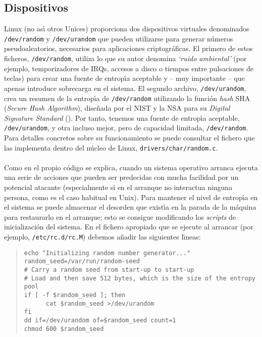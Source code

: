 \subsection{Dispositivos}
Linux (no as\'{\i} otros Unices) proporciona dos dispositivos virtuales 
denominados {\tt /dev/random} y {\tt /dev/urandom} que pueden utilizarse para
generar n\'umeros pseudoaleatorios, necesarios para aplicaciones 
criptogr\'aficas. El primero de estos ficheros, {\tt /dev/random}, utiliza lo
que su autor denomina {\it `ruido ambiental'} (por ejemplo, temporizadores de
IRQs, accesos a disco o tiempos entre pulsaciones de teclas) para crear 
una fuente de entrop\'{\i}a aceptable y -- muy importante -- que apenas 
introduce sobrecarga en el sistema. El segundo archivo, {\tt /dev/urandom},
crea un resumen de la entrop\'{\i}a de {\tt /dev/random} utilizando la 
funci\'on {\it hash} SHA ({\it Secure Hash Algorithm}), dise\~nada por el 
NIST y la NSA para su {\it Digital Signature Standard} (\cite{kn:nist186}). Por
tanto, tenemos una fuente de entrop\'{\i}a aceptable, {\tt /dev/urandom}, y
otra incluso mejor, pero de capacidad limitada, {\tt /dev/random}. Para detalles
concretos sobre su funcionamiento se puede consultar el fichero que las 
implementa dentro del n\'ucleo de Linux, {\tt drivers/char/random.c}.\\
\\Como en el propio c\'odigo se explica, cuando un sistema operativo arranca
ejecuta una serie de acciones que pueden ser predecidas con mucha facilidad
por un potencial atacante (especialmente si en el arranque no interactua 
ninguna persona, como es el caso habitual en Unix). Para mantener el nivel de
entrop\'{\i}a en el sistema se puede almacenar el desorden que exist\'{\i}a
en la parada de la m\'aquina para restaurarlo en el arranque; esto se consigue
modificando los {\it scripts} de inicializaci\'on del sistema. En el fichero
apropiado que se ejecute al arrancar (por ejemplo, {\tt /etc/rc.d/rc.M}) 
debemos a\~nadir las siguientes l\'{\i}neas:
\tt
\begin{quote}
\begin{verbatim}
echo "Initializing random number generator..."
random_seed=/var/run/random-seed
# Carry a random seed from start-up to start-up
# Load and then save 512 bytes, which is the size of the entropy pool
if [ -f $random_seed ]; then
      cat $random_seed >/dev/urandom
fi
dd if=/dev/urandom of=$random_seed count=1
chmod 600 $random_seed
\end{verbatim}
\end{quote}
